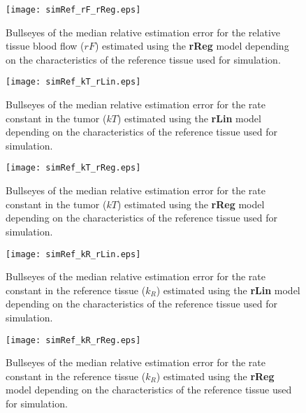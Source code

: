 \begin{figure}
\texttt{[image: simRef\_rF\_rReg.eps]}
\caption{Bullseyes of the median relative estimation error for the relative tissue blood flow ($rF$) estimated using the \textbf{rReg} model depending on the characteristics of the reference tissue used for simulation.}
\label{fig:referenceTissue_rF_rReg}
\end{figure}

\begin{figure}
\texttt{[image: simRef\_kT\_rLin.eps]}
\caption{Bullseyes of the median relative estimation error for the rate constant in the tumor ($kT$) estimated using the \textbf{rLin} model depending on the characteristics of the reference tissue used for simulation.}
\label{fig:referenceTissue_kT_rLin}
\end{figure}

\begin{figure}
\texttt{[image: simRef\_kT\_rReg.eps]}
\caption{Bullseyes of the median relative estimation error for the rate constant in the tumor ($kT$) estimated using the \textbf{rReg} model depending on the characteristics of the reference tissue used for simulation.}
\label{fig:referenceTissue_kT_rReg}
\end{figure}

\begin{figure}
\texttt{[image: simRef\_kR\_rLin.eps]}
\caption{Bullseyes of the median relative estimation error for the rate constant in the reference tissue ($k_R$) estimated using the \textbf{rLin} model depending on the characteristics of the reference tissue used for simulation.}
\label{fig:referenceTissue_kR_rLin}
\end{figure}

\begin{figure}
\texttt{[image: simRef\_kR\_rReg.eps]}
\caption{Bullseyes of the median relative estimation error for the rate constant in the reference tissue ($k_R$) estimated using the \textbf{rReg} model depending on the characteristics of the reference tissue used for simulation.}
\label{fig:referenceTissue_kR_rReg}
\end{figure}


